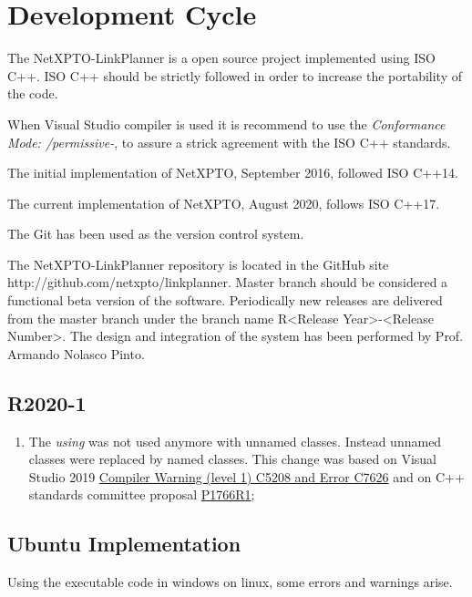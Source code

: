 
\chapter{Development Cycle}

The NetXPTO-LinkPlanner is a open source project implemented using ISO C++.
ISO C++ should be strictly followed in order to increase the portability of the code.

When Visual Studio compiler is used it is recommend to use the \emph{Conformance Mode: /permissive-}, to assure a strick agreement with the ISO C++ standards.

The initial implementation of NetXPTO, September 2016, followed ISO C++14.

The current implementation of NetXPTO, August 2020, follows ISO C++17.

The Git has been used as the version control system.

The NetXPTO-LinkPlanner repository is located in the GitHub site http://github.com/netxpto/linkplanner.
Master branch should be considered a functional beta version of the software.
Periodically new releases are delivered from the master branch under the branch name R<Release Year>-<Release Number>.
The design and integration of the system has been performed by Prof. Armando Nolasco Pinto.

\section{R2020-1}

\begin{enumerate}
    \item {The \emph{using} was not used anymore with unnamed classes.
        Instead unnamed classes were replaced by named classes.
        This change was based on Visual Studio 2019 \href{https://docs.microsoft.com/en-us/cpp/error-messages/compiler-warnings/c5208?view=vs-2019}{Compiler Warning (level 1) C5208 and Error C7626} and on C++ standards committee proposal \href{http://www.open-std.org/jtc1/sc22/wg21/docs/papers/2019/p1766r1.html}{P1766R1};}
\end{enumerate}

\section{Ubuntu Implementation}

Using the executable code in windows on linux, some errors and warnings arise.

